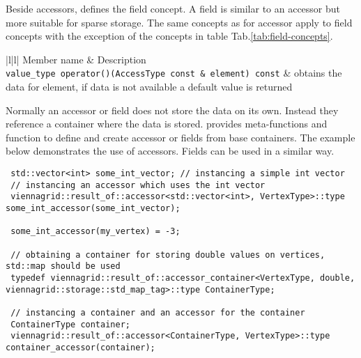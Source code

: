  Beside accessors, {\ViennaGrid} defines the field concept. A field is similar to an accessor but more suitable for sparse storage. The same concepts as for accessor apply to field concepts with the exception of the concepts in table Tab.\ref{tab:field-concepts}.
 
 \begin{table}[tb]
 \begin{center}
  \begin{tabular}{|l|l|}
   \hline
   Member name & Description \\
   \hline
   \lstinline|value_type operator()(AccessType const & element) const| &  obtains the data for element, if data is not available a default value is returned \\
   \hline
  \end{tabular}
 \end{center}
 \caption{Field concepts}
 \label{tab:field-concepts}
 \end{table}
 
 Normally an accessor or field does not store the data on its own. Instead they reference a container where the data is stored. {\ViennaGrid} provides meta-functions and function to define and create accessor or fields from base containers. The example below demonstrates the use of {\ViennaGrid} accessors. Fields can be used in a similar way.
 
 \begin{lstlisting}
 std::vector<int> some_int_vector; // instancing a simple int vector
 // instancing an accessor which uses the int vector
 viennagrid::result_of::accessor<std::vector<int>, VertexType>::type some_int_accessor(some_int_vector);
 
 some_int_accessor(my_vertex) = -3;
 
 // obtaining a container for storing double values on vertices, std::map should be used
 typedef viennagrid::result_of::accessor_container<VertexType, double, viennagrid::storage::std_map_tag>::type ContainerType;
 
 // instancing a container and an accessor for the container
 ContainerType container;
 viennagrid::result_of::accessor<ContainerType, VertexType>::type container_accessor(container);
\end{lstlisting}
